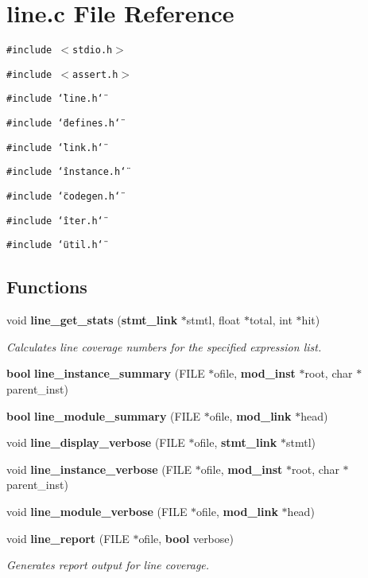 \section{line.c File Reference}
\label{line_8c}
{\tt \#include $<$stdio.h$>$}\par
{\tt \#include $<$assert.h$>$}\par
{\tt \#include \char`\"{}line.h\char`\"{}}\par
{\tt \#include \char`\"{}defines.h\char`\"{}}\par
{\tt \#include \char`\"{}link.h\char`\"{}}\par
{\tt \#include \char`\"{}instance.h\char`\"{}}\par
{\tt \#include \char`\"{}codegen.h\char`\"{}}\par
{\tt \#include \char`\"{}iter.h\char`\"{}}\par
{\tt \#include \char`\"{}util.h\char`\"{}}\par
\subsection*{Functions}
\begin{CompactItemize}
\item 
void {\bf line\_\-get\_\-stats} ({\bf stmt\_\-link} $\ast$stmtl, float $\ast$total, int $\ast$hit)
\begin{CompactList}\small\item\em Calculates line coverage numbers for the specified expression list.\item\end{CompactList}\item 
{\bf bool} {\bf line\_\-instance\_\-summary} (FILE $\ast$ofile, {\bf mod\_\-inst} $\ast$root, char $\ast$parent\_\-inst)
\item 
{\bf bool} {\bf line\_\-module\_\-summary} (FILE $\ast$ofile, {\bf mod\_\-link} $\ast$head)
\item 
void {\bf line\_\-display\_\-verbose} (FILE $\ast$ofile, {\bf stmt\_\-link} $\ast$stmtl)
\item 
void {\bf line\_\-instance\_\-verbose} (FILE $\ast$ofile, {\bf mod\_\-inst} $\ast$root, char $\ast$parent\_\-inst)
\item 
void {\bf line\_\-module\_\-verbose} (FILE $\ast$ofile, {\bf mod\_\-link} $\ast$head)
\item 
void {\bf line\_\-report} (FILE $\ast$ofile, {\bf bool} verbose)
\begin{CompactList}\small\item\em Generates report output for line coverage.\item\end{CompactList}\end{CompactItemize}
